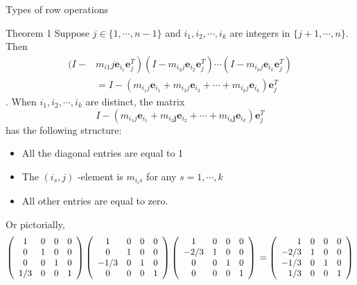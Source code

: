 \documentclass[10pt,landscape]{article}
\theoremstyle{definition}
\newcommand{\thistheoremname}{}
\newtheorem*{genericthm*}{\thistheoremname}
\newenvironment{namedthm*}[1]
{\renewcommand{\thistheoremname}{#1}\begin{genericthm*}}
{\end{genericthm*}}
\begin{document}
\begin{multicols}{3}
\begin{namedthm*}{Types of row operations}
\begin{enumerate}
\end{enumerate}
\end{namedthm*}

\begin{namedthm*}{Theorem 1}
Suppose $j \in\{1, \cdots, n-1\}$ and $i_{1}, i_{2}, \cdots, i_{k}$ are integers in $\{j+1, \cdots, n\} .$ Then
$$
\begin{aligned}(I-&\left.m_{i 1} j \mathbf{e}_{i_{1}} \mathbf{e}_{j}^{T}\right)\left(I-m_{i_{2} j} \mathbf{e}_{i_{2}} \mathbf{e}_{j}^{T}\right) \cdots\left(I-m_{i_{k} j} \mathbf{e}_{i_{k}} \mathbf{e}_{j}^{T}\right) \\ &=I-\left(m_{i_{1} j} \mathbf{e}_{i_{1}}+m_{i_{2} j} \mathbf{e}_{i_{2}}+\cdots+m_{i_{k} j} \mathbf{e}_{i_{k}}\right) \mathbf{e}_{j}^{T} \end{aligned}
$$. When $i_{1}, i_{2}, \cdots, i_{k}$ are distinct, the matrix
$$
I-\left(m_{i_{1} j} \mathbf{e}_{i_{1}}+m_{i_{2} \mathbf{j}} \mathbf{e}_{i_{2}}+\cdots+m_{i_{k} \mathbf{j}} \mathbf{e}_{i_{k}}\right) \mathbf{e}_{j}^{T}
$$ has the following structure:
\begin{itemize}
    \item All the diagonal entries are equal to 1
    \item The $\left(i_{s}, j\right)$ -element is $m_{i_{i} s}$ for any $s=1, \cdots, k$
    \item All other entries are equal to zero.
\end{itemize}
Or pictorially,
$$
\left(\begin{array}{cccc}{1} & {0} & {0} & {0} \\ {0} & {1} & {0} & {0} \\ {0} & {0} & {1} & {0} \\ {1 / 3} & {0} & {0} & {1}\end{array}\right)\left(\begin{array}{cccc}{1} & {0} & {0} & {0} \\ {0} & {1} & {0} & {0} \\ {-1 / 3} & {0} & {1} & {0} \\ {0} & {0} & {0} & {1}\end{array}\right)\left(\begin{array}{cccc}{1} & {0} & {0} & {0} \\ {-2 / 3} & {1} & {0} & {0} \\ {0} & {0} & {1} & {0} \\ {0} & {0} & {0} & {1}\end{array}\right)\\=\left(\begin{array}{rrrr}{1} & {0} & {0} & {0} \\ {-2 / 3} & {1} & {0} & {0} \\ {-1 / 3} & {0} & {1} & {0} \\ {1 / 3} & {0} & {0} & {1}\end{array}\right)
$$
\end{namedthm*}
\end{multicols}
\end{document}

